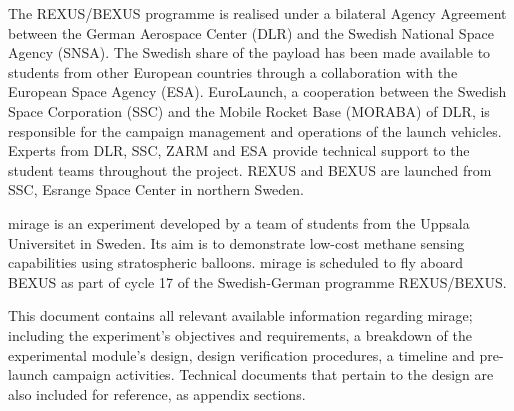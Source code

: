 \documentclass[
  a4paper,
  11pt,
  openany,
  parskip,
  toc=totoc,
  listof=totoc,
  bibliography=totoc
]{scrreprt}
\begin{document}
\cleardoublepage

The REXUS/BEXUS programme is realised under a bilateral Agency Agreement between the German Aerospace Center (DLR) and the Swedish National Space Agency (SNSA). The Swedish share of the payload has been made available to students from other European countries through a collaboration with the European Space Agency (ESA). EuroLaunch, a cooperation between the Swedish Space Corporation (SSC) and the Mobile Rocket Base (MORABA) of DLR, is responsible for the campaign management and operations of the launch vehicles. Experts from DLR, SSC, ZARM and ESA provide technical support to the student teams throughout the project. REXUS and BEXUS are launched from SSC, Esrange Space Center in northern Sweden.

\gls{mirage} is an experiment developed by a team of students from the Uppsala Universitet in Sweden. Its aim is to demonstrate low-cost methane sensing capabilities using stratospheric balloons. \gls{mirage} is scheduled to fly aboard BEXUS as part of cycle 17 of the Swedish-German programme REXUS/BEXUS.

This document contains all relevant available information regarding \gls{mirage}; including the experiment's objectives and requirements, a breakdown of the experimental module's design, design verification procedures, a timeline and pre-launch campaign activities. Technical documents that pertain to the design are also included for reference, as appendix sections.\newpage

\end{document}
